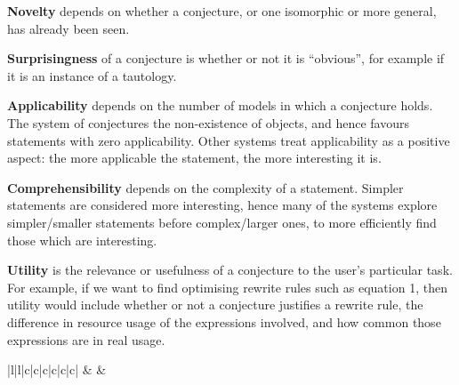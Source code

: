 {\bf Novelty} depends on whether a conjecture, or one isomorphic or more
general, has already been seen.

{\bf Surprisingness} of a conjecture is whether or not it is
``obvious'', for example if it is an instance of a tautology.

{\bf Applicability} depends on the number of models in which a
conjecture holds. The system of \Bagai{} conjectures the non-existence of
objects, and hence favours statements with zero applicability. Other systems
treat applicability as a positive aspect: the more applicable the statement, the
more interesting it is.

{\bf Comprehensibility} depends on the complexity of a statement. Simpler
statements are considered more interesting, hence many of the systems explore
simpler/smaller statements before complex/larger ones, to more efficiently find
those which are interesting.

{\bf Utility} is the relevance or usefulness of a conjecture to the
user's particular task. For example, if we want to find optimising
rewrite rules such as equation 1, then utility would include whether
or not a conjecture justifies a rewrite rule, the difference in
resource usage of the expressions involved, and how common those
expressions are in real usage.


\begin{table}
  \centering
  \begin{tabular}{ |l|l|c|c|c|c|c|c| }
    \hline
                          &
                 &
     \\ \hhline{~~------}
    \tRow{          &                     & \iE & \iN & \iS & \iA & \iC & \iU}
  \end{tabular}
  \caption{Classification of MTE systems from~\cite{colton2000notion}, extended
    to include those from~\cite{claessen2013automating} (QuickSpec is the
    conjecture generation component of HipSpec) and the similar Speculate
    system~\cite{braquehais2017speculate}. The interestingness measures are
    to include four more recent systems. The interestingness measures are
    \iE{}mpirical plausibility, \iN{}ovelty, \iS{}urprisingness,
    \iA{}pplicability, \iC{}omprehensibility (low complexity) and \iU{}tility.}
  \label{table:colton}
\end{table}

